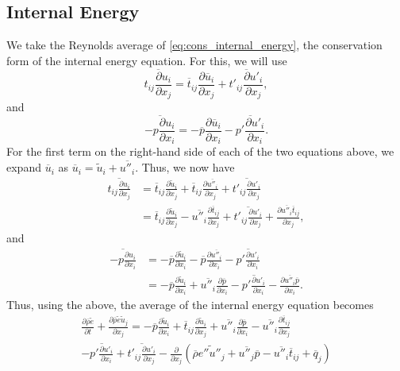 \documentclass[oneside,a4paper,11pt]{report}
\newcommand{\rhoavg}{\overline{\rho}}
\newcommand{\pavg}{\overline{p}}
\newcommand{\qavg}{\overline{q}}
\newcommand{\tavg}{\overline{t}}
\newcommand{\uavg}{\overline{u}}
\newcommand{\pfluc}{p'}
\newcommand{\tfluc}{t'}
\newcommand{\ufluc}{u'}
\newcommand{\eavgf}{\widetilde{e}}
\newcommand{\uavgf}{\widetilde{u}}
\newcommand{\eflucf}{e''}
\newcommand{\uflucf}{u''}
\begin{document}
\subsection{Internal Energy}
We take the Reynolds average of \cref{eq:cons_internal_energy}, the conservation form of the internal energy equation. For this, we will use
\begin{equation}
    \overline{ t_{ij} \frac{\partial u_i}{\partial x_j} } = \tavg_{ij} \frac{\partial \uavg_i}{\partial x_j} + \overline{ \tfluc_{ij} \frac{\partial \ufluc_i}{\partial x_j} },
\end{equation}
and
\begin{equation}
    \overline{ -p \frac{\partial u_i}{\partial x_i} } = -\pavg \frac{\partial \uavg_i}{\partial x_i} - \overline{ \pfluc \frac{\partial \ufluc_i}{\partial x_i} }.
\end{equation}
For the first term on the right-hand side of each of the two equations above, we expand $\uavg_i$ as $\uavg_i = \uavgf_i + \overline{ \uflucf_i }$. Thus, we now have 
\begin{align}
    \overline{ t_{ij} \frac{\partial u_i}{\partial x_j} } &=  \tavg_{ij}  \frac{\partial \uavgf_i}{\partial x_j} + \tavg_{ij}  \frac{\partial \overline{ \uflucf_i } }{\partial x_j} + \overline{ \tfluc_{ij} \frac{\partial \ufluc_i}{\partial x_j} } \nonumber \\
    &= \tavg_{ij} \frac{\partial \uavgf_i}{\partial x_j} - \overline{ \uflucf_i } \frac{\partial \tavg_{ij} }{\partial x_j} + \overline{ \tfluc_{ij} \frac{\partial \ufluc_i}{\partial x_j} } + \frac{\partial \overline{ \uflucf_i } \tavg_{ij} }{\partial x_j},
\end{align}
and
\begin{align}
    \overline{ -p \frac{\partial u_i}{\partial x_i} } &= -\pavg \frac{\partial \uavgf_i}{\partial x_i} - \pavg \frac{\partial \overline{ \uflucf_i } }{\partial x_i} - \overline{ \pfluc \frac{\partial \ufluc_i}{\partial x_i} } \nonumber \\
    &= -\pavg \frac{\partial \uavgf_i}{\partial x_i} + \overline{ \uflucf_i } \frac{\partial \pavg}{\partial x_i} - \overline{ \pfluc \frac{\partial \ufluc_i}{\partial x_i} } - \frac{\partial \overline{ \uflucf_i } \pavg}{\partial x_i}.
\end{align}
Thus, using the above, the average of the internal energy equation becomes
\begin{multline}
    \frac{\partial \rhoavg \eavgf}{\partial t} + \frac{\partial \rhoavg \eavgf \uavgf_j}{\partial x_j} = -\pavg \frac{\partial \uavgf_i}{\partial x_i} + \tavg_{ij} \frac{\partial \uavgf_i}{\partial x_j} + \overline{ \uflucf_i } \frac{\partial \pavg}{\partial x_i} - \overline{ \uflucf_i } \frac{\partial \tavg_{ij} }{\partial x_j} \\
    - \overline{ \pfluc \frac{\partial \ufluc_i}{\partial x_i} } + \overline{ \tfluc_{ij} \frac{\partial \ufluc_i}{\partial x_j} } - \frac{\partial}{\partial x_j} \left ( \rhoavg \widetilde{ \eflucf \uflucf_j }  +  \overline{ \uflucf_j } \pavg - \overline{ \uflucf_i } \tavg_{ij} + \qavg_j \right)
\end{multline}
\end{document}
